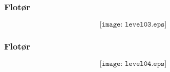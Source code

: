 \documentclass[aspectratio=169,xcolor=dvipsnames]{beamer}
\begin{document}
%
%
%
%
%
%
%
%
%
%
\begin{frame}
	\frametitle{Flotør}

$$\texttt{[image: level03.eps]}$$
\end{frame}
%
%
%
%
%
\begin{frame}
	\frametitle{Flotør}

$$\texttt{[image: level04.eps]}$$
\end{frame}
\end{document}
